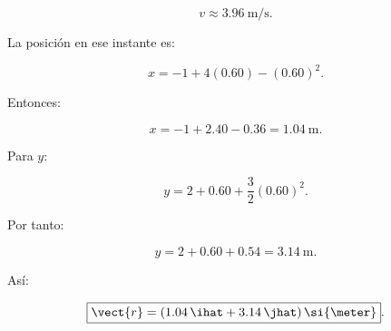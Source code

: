 \begin{explicacion}
\[
\boxed{
v\approx\SI{3.96}{\meter\per\second}
}.
\]

La posición en ese instante es:

\[
x
=
-1+4(0.60)-(0.60)^2.
\]

Entonces:

\[
x
=
-1+2.40-0.36
=
\SI{1.04}{\meter}.
\]

Para \(y\):

\[
y
=
2+0.60+\frac{3}{2}(0.60)^2.
\]

Por tanto:

\[
y
=
2+0.60+0.54
=
\SI{3.14}{\meter}.
\]

Así:

\[
\boxed{
\vect{r}
=
(1.04\,\ihat+3.14\,\jhat)\,\si{\meter}
}.
\]
\end{explicacion}
